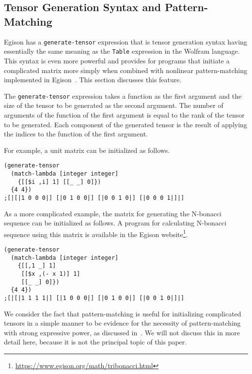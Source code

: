 \documentclass[acmlarge]{acmart}
\begin{document}
\subsection{Tensor Generation Syntax and Pattern-Matching}

Egison has a \texttt{generate-tensor} expression that is tensor generation syntax having essentially the same meaning as the \texttt{Table} expression in the Wolfram language.
This syntax is even more powerful and provides for programs that initiate a complicated matrix more simply when combined with nonlinear pattern-matching implemented in Egison~\cite{egi2014non}.
This section discusses this feature.

The \texttt{generate-tensor} expression takes a function as the first argument and the size of the tensor to be generated as the second argument.
The number of arguments of the function of the first argument is equal to the rank of the tensor to be generated.
Each component of the generated tensor is the result of applying the indices to the function of the first argument.

For example, a unit matrix can be initialized as follows.

{\footnotesize
\begin{verbatim}
(generate-tensor
  (match-lambda [integer integer]
    {[[$i ,i] 1] [[_ _] 0]})
  {4 4})
;[|[|1 0 0 0|] [|0 1 0 0|] [|0 0 1 0|] [|0 0 0 1|]|]
\end{verbatim}
}

As a more complicated example, the matrix for generating the N-bonacci sequence can be initialized as follows.
A program for calculating N-bonacci sequence using this matrix is available in the Egison website\footnote{\url{https://www.egison.org/math/tribonacci.html}}.

{\footnotesize
\begin{verbatim}
(generate-tensor
  (match-lambda [integer integer]
    {[[,1 _] 1]
     [[$x ,(- x 1)] 1]
     [[_ _] 0]})
  {4 4})
;[|[|1 1 1 1|] [|1 0 0 0|] [|0 1 0 0|] [|0 0 1 0|]|]
\end{verbatim}
}

We consider the fact that pattern-matching is useful for initializing complicated tensors in a simple manner to be evidence for the necessity of pattern-matching with strong expressive power, as discussed in~\cite{egi2014non}.
We will not discuss this in more detail here, because it is not the principal topic of this paper.
\end{document}

